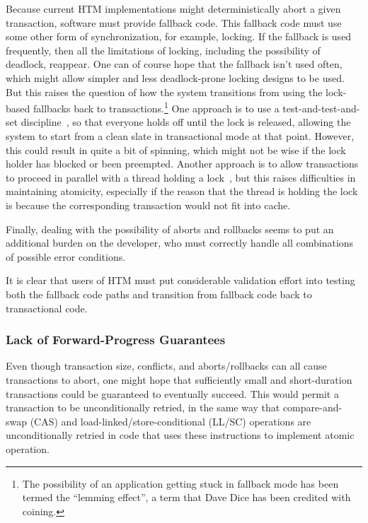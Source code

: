 Because current HTM implementations might deterministically abort a
given transaction, software must provide fallback code.
This fallback code must use some other form of synchronization, for
example, locking.
If the fallback is used frequently, then all the limitations of locking,
including the possibility of deadlock, reappear.
One can of course hope that the fallback isn't used often, which might
allow simpler and less deadlock-prone locking designs to be used.
But this raises the question of how the system transitions from using
the lock-based fallbacks back to transactions.\footnote{
	The possibility of an application getting stuck in fallback
	mode has been termed the ``lemming effect'', a term that
	Dave Dice has been credited with coining.}
One approach is to use a test-and-test-and-set discipline~\cite{Martinez02a},
so that everyone holds off until the lock is released, allowing the
system to start from a clean slate in transactional mode at that point.
However, this could result in quite a bit of spinning, which might not
be wise if the lock holder has blocked or been preempted.
Another approach is to allow transactions to proceed in parallel with
a thread holding a lock~\cite{Martinez02a}, but this raises difficulties
in maintaining atomicity, especially if the reason that the thread is
holding the lock is because the corresponding transaction would not fit
into cache.

Finally, dealing with the possibility of aborts and rollbacks seems to
put an additional burden on the developer, who must correctly handle
all combinations of possible error conditions.

It is clear that users of HTM must put considerable validation effort
into testing both the fallback code paths and transition from fallback
code back to transactional code.

\subsubsection{Lack of Forward-Progress Guarantees}
\label{sec:future:Lack of Forward-Progress Guarantees}

Even though transaction size, conflicts, and aborts/rollbacks can all
cause transactions to abort, one might hope that sufficiently small and
short-duration transactions could be guaranteed to eventually succeed.
This would permit a transaction to be unconditionally retried, in the
same way that compare-and-swap (CAS) and load-linked/store-conditional
(LL/SC) operations are unconditionally retried in code that uses these
instructions to implement atomic operation.

